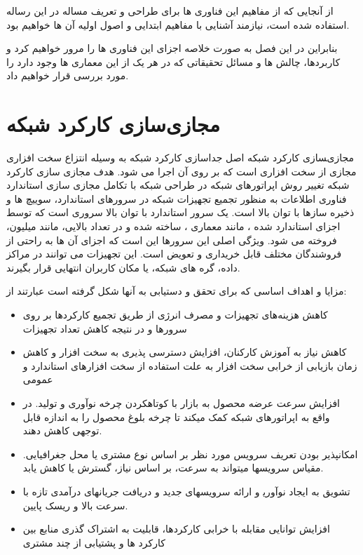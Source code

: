 از آنجایی که از مفاهیم این فناوری ها برای طراحی و تعریف مساله در این رساله استفاده شده است، نیازمند آشنایی با مفاهیم ابتدایی و اصول اولیه آن ها خواهیم بود.

بنابراین در این فصل به صورت خلاصه اجزای این فناوری ها را مرور خواهیم کرد و کاربردها، چالش ها و مسائل تحقیقاتی که در هر یک از این معماری ها وجود دارد را مورد بررسی قرار خواهیم داد.

\section{مجازی‌سازی کارکرد شبکه}

مجازی‌‍سازی کارکرد شبکه اصل جداسازی کارکرد شبکه به وسیله انتزاع سخت افزاری مجازی از سخت افزاری است که بر روی آن اجرا می شود.
هدف مجازی سازی کارکرد شبکه تغییر روش اپراتورهای شبکه در طراحی شبکه با تکامل مجازی سازی استاندارد فناوری اطلاعات به منظور تجمیع تجهیزات شبکه در سرورهای استاندارد، سوییچ ها و ذخیره سازها با توان بالا است.
یک سرور استاندارد با توان بالا سروری است که توسط اجزای استاندارد شده ، مانند معماری ، ساخته شده و در تعداد بالایی، مانند میلیون، فروخته می شود.
ویژگی اصلی این سرورها این است که اجزای آن ها به راحتی از فروشندگان مختلف قابل خریداری و تعویض است.
این تجهیزات می توانند در مراکز داده، گره های شبکه، یا مکان کاربران انتهایی قرار بگیرند.

مزایا و اهداف اساسی که  برای تحقق و دست‍یابی به آن‍ها شکل گرفته است عبارتند از:

\begin{itemize}
    \item
    کاهش هزینه‌های تجهیزات و مصرف انرژی از طریق تجمیع کارکردها بر روی سرورها و در نتیجه کاهش تعداد تجهیزات
    \item
    کاهش نیاز به آموزش کارکنان، افزایش دسترسی پذیری به سخت افزار و کاهش زمان بازیابی از خرابی سخت افزار به علت استفاده از سخت افزارهای استاندارد و عمومی
    \item
    افزایش سرعت عرضه محصول به بازار با کوتاه‍کردن چرخه نوآوری و تولید. در واقع  به اپراتورهای شبکه کمک می‍کند تا چرخه بلوغ محصول را به اندازه قابل توجهی کاهش دهند.
    \item
    امکان‍پذیر بودن تعریف سرویس مورد نظر بر اساس نوع مشتری یا محل جغرافیایی. مقیاس سرویس‍ها می‍تواند به سرعت، بر اساس نیاز، گسترش یا کاهش یابد.
    \item
    تشویق به ایجاد نوآوری‍ و ارائه سرویس‍های جدید و دریافت جریان‍های درآمدی تازه با سرعت بالا و ریسک پایین.
    \item
    افزایش توانایی  مقابله با خرابی کارکردها، قابلیت به اشتراک گذری منابع بین کارکرد ها و پشتیابی از چند مشتری
\end{itemize}

